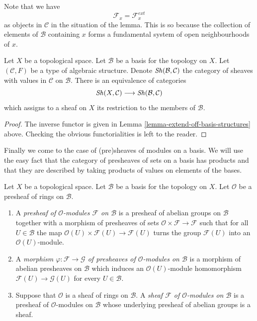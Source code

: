 \noindent
Note that we have
$$
\mathcal{F}_x = \mathcal{F}_x^{ext}
$$
as objects in $\mathcal{C}$
in the situation of the lemma. This is so because the
collection of elements of $\mathcal{B}$ containing
$x$ forms a fundamental system of open neighbourhoods of $x$.

\begin{lemma}
\label{lemma-restrict-basis-equivalence-structures}
Let $X$ be a topological space.
Let $\mathcal{B}$ be a basis for the topology on $X$.
Let $(\mathcal{C}, F)$ be a type of algebraic structure.
Denote $\mathop{\mathit{Sh}}\nolimits(\mathcal{B}, \mathcal{C})$ the category of
sheaves with values in $\mathcal{C}$ on $\mathcal{B}$.
There is an equivalence of categories
$$
\mathop{\mathit{Sh}}\nolimits(X, \mathcal{C})
\longrightarrow
\mathop{\mathit{Sh}}\nolimits(\mathcal{B}, \mathcal{C})
$$
which assigns to a sheaf on $X$ its restriction to
the members of $\mathcal{B}$.
\end{lemma}

\begin{proof}
The inverse functor is given in
Lemma \ref{lemma-extend-off-basis-structures} above.
Checking the obvious functorialities is left to the
reader.
\end{proof}

\noindent
Finally we come to the case of (pre)sheaves of modules
on a basis. We will use the easy fact that the category
of presheaves of sets on a basis has products and that
they are described by taking products of values on
elements of the bases.

\begin{definition}
\label{definition-sheaf-modules-basis}
Let $X$ be a topological space. Let $\mathcal{B}$ be a
basis for the topology on $X$. Let $\mathcal{O}$ be
a presheaf of rings on $\mathcal{B}$.
\begin{enumerate}
\item A {\it presheaf of $\mathcal{O}$-modules $\mathcal{F}$
on $\mathcal{B}$} is a presheaf of abelian groups on
$\mathcal{B}$ together with a morphism of presheaves
of sets $\mathcal{O} \times \mathcal{F} \to \mathcal{F}$
such that for all $U \in \mathcal{B}$ the map
$\mathcal{O}(U) \times \mathcal{F}(U) \to \mathcal{F}(U)$
turns the group $\mathcal{F}(U)$ into an $\mathcal{O}(U)$-module.
\item A {\it morphism $\varphi : \mathcal{F} \to \mathcal{G}$
of presheaves of $\mathcal{O}$-modules on $\mathcal{B}$}
is a morphism of abelian presheaves on $\mathcal{B}$
which induces an $\mathcal{O}(U)$-module homomorphism
$\mathcal{F}(U) \to \mathcal{G}(U)$ for every $U \in \mathcal{B}$.
\item Suppose that $\mathcal{O}$ is a sheaf of rings
on $\mathcal{B}$. A {\it sheaf $\mathcal{F}$ of $\mathcal{O}$-modules
on $\mathcal{B}$} is a presheaf of $\mathcal{O}$-modules
on $\mathcal{B}$ whose underlying presheaf of abelian groups
is a sheaf.
\end{enumerate}
\end{definition}

